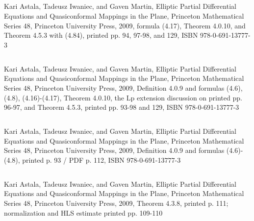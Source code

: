 \documentclass[10pt,oneside]{article}
\begin{document}
\subsection*{\texttt{}}
Kari Astala, Tadeusz Iwaniec, and Gaven Martin, Elliptic Partial Differential Equations and Quasiconformal Mappings in the Plane, Princeton Mathematical Series 48, Princeton University Press, 2009, formula (4.17), Theorem 4.0.10, and Theorem 4.5.3 with (4.84), printed pp. 94, 97-98, and 129, ISBN 978-0-691-13777-3

\subsection*{\texttt{}}
Kari Astala, Tadeusz Iwaniec, and Gaven Martin, Elliptic Partial Differential Equations and Quasiconformal Mappings in the Plane, Princeton Mathematical Series 48, Princeton University Press, 2009, Definition 4.0.9 and formulas (4.6), (4.8), (4.16)-(4.17), Theorem 4.0.10, the Lp extension discussion on printed pp. 96-97, and Theorem 4.5.3, printed pp. 93-98 and 129, ISBN 978-0-691-13777-3

\subsection*{\texttt{}}
Kari Astala, Tadeusz Iwaniec, and Gaven Martin, Elliptic Partial Differential Equations and Quasiconformal Mappings in the Plane, Princeton Mathematical Series 48, Princeton University Press, 2009, Definition 4.0.9 and formulas (4.6)-(4.8), printed p. 93 / PDF p. 112, ISBN 978-0-691-13777-3

\subsection*{\texttt{}}
Kari Astala, Tadeusz Iwaniec, and Gaven Martin, Elliptic Partial Differential Equations and Quasiconformal Mappings in the Plane, Princeton Mathematical Series 48, Princeton University Press, 2009, Theorem 4.3.8, printed p. 111; normalization and HLS estimate printed pp. 109-110
\end{document}
